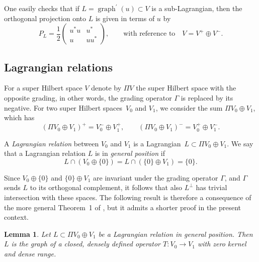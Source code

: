 \documentclass[pdftex]{sigma}
\numberwithin{equation}{section}
\newtheorem{Lemma}[Theorem]{Lemma}
\DeclareMathOperator{\graph}{\mathrm{graph}}
\begin{document}
\begin{Remark}
One easily checks that if $L = \graph^\prime(u) \subset V$ is a sub-Lagrangian, then the orthogonal projection onto $L$ is given in terms of $u$ by
\begin{equation} \label{FormulaForProjection}
 P_L = \frac{1}{2} \begin{pmatrix} u^*u & u^* \\ u & uu^* \end{pmatrix}, \qquad \text{with reference to} \quad V = V^+ \oplus V^-.
\end{equation}
\end{Remark}

\subsection{Lagrangian relations}

For a super Hilbert space $V$ denote by $\Pi V$ the super Hilbert space with the opposite grading, in other words, the grading operator $\Gamma$ is replaced by its negative.
For two super Hilbert spaces~$V_0$ and $V_1$, we consider the sum $\Pi V_0 \oplus V_1$, which has
\begin{equation*}
(\Pi V_0 \oplus V_1)^+ = V_0^- \oplus V_1^+, \qquad (\Pi V_0 \oplus V_1)^- = V_0^+ \oplus V_1^-.
\end{equation*}

\begin{Definition}
A \emph{Lagrangian relation} between $V_0$ and $V_1$ is a Lagrangian~${L \subset \Pi V_0 \oplus V_1}$.
We say that a Lagrangian relation $L$ is in \emph{general position} if
\begin{equation*}
L \cap (V_0 \oplus \{0\}) = L \cap (\{0\} \oplus V_1) = \{0\}.
\end{equation*}
\end{Definition}

\begin{Remark}
Since $V_0 \oplus \{0\}$ and $\{0\} \oplus V_1$ are invariant under the grading operator $\Gamma$, and $\Gamma$ sends $L$ to its orthogonal complement, it follows that also $L^\perp$ has trivial intersection with these spaces.
The following result is therefore a consequence of the more general Theorem~1 of \cite{HalmosTwoSubspaces}, but it admits a shorter proof in the present context.
\end{Remark}

\begin{Lemma} \label{LemmaGraph1}
Let $L \subset \Pi V_0 \oplus V_1$ be a Lagrangian relation in general position.
Then $L$ is the graph of a closed, densely defined operator $T\colon V_0 \rightarrow V_1$ with zero kernel and dense range.
\end{Lemma}
\end{document}
